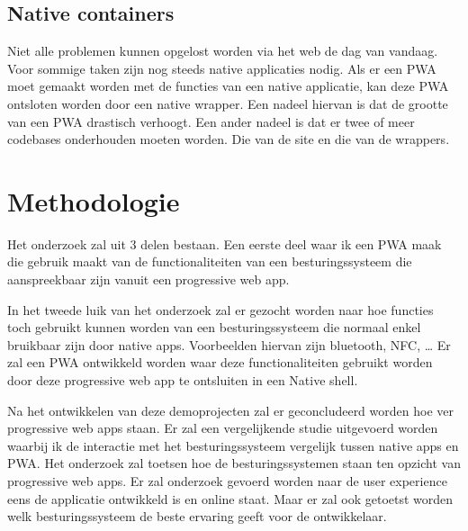 \subsection{Native containers}
Niet alle problemen kunnen opgelost worden via het web de dag van vandaag. Voor sommige taken zijn nog steeds native applicaties nodig. Als er een PWA moet gemaakt worden met de functies van een native applicatie, kan deze PWA ontsloten worden door een native wrapper.
Een nadeel hiervan is dat de grootte van een PWA drastisch verhoogt.
Een ander nadeel is dat er twee of meer codebases onderhouden moeten worden. Die van de site en die van de wrappers.
\autocite{GoogleChromeDevelopers2019}





\section{Methodologie}
\label{sec:methodologie}
Het onderzoek zal uit 3 delen bestaan. Een eerste deel waar ik een PWA maak die gebruik maakt van de functionaliteiten van een besturingssysteem die aanspreekbaar zijn vanuit een progressive web app. 

In het tweede luik van het onderzoek zal er gezocht worden naar hoe functies toch gebruikt kunnen worden van een besturingssysteem die normaal enkel bruikbaar zijn door native apps. Voorbeelden hiervan zijn bluetooth, NFC, … 
Er zal een PWA ontwikkeld worden waar deze functionaliteiten gebruikt worden  door deze progressive web app te ontsluiten in een Native shell.

Na het ontwikkelen van deze demoprojecten zal er geconcludeerd worden hoe ver progressive web apps staan. Er zal een vergelijkende studie uitgevoerd worden waarbij ik de interactie met het besturingssysteem vergelijk tussen native apps en PWA.
Het onderzoek zal toetsen hoe de besturingssystemen staan ten opzicht van progressive web apps. Er zal onderzoek gevoerd worden naar de user experience eens de applicatie ontwikkeld is en online staat. Maar er zal ook getoetst worden welk besturingssysteem de beste ervaring geeft voor de ontwikkelaar.


